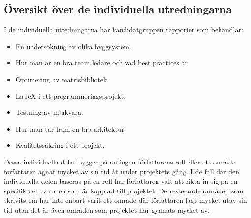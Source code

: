 \subsection{Översikt över de individuella utredningarna}
I de individuella utredningarna har kandidatgruppen rapporter som behandlar: 
\begin{itemize}
	\item En undersökning av olika byggsystem.
	\item Hur man är en bra team ledare och vad best practices är.
	\item Optimering av matrisbibliotek. 
	\item {\LaTeX} i ett programmeringsprojekt.
	\item Testning av mjukvara. 
	\item Hur man tar fram en bra arkitektur. 
	\item Kvalitetssäkring i ett projekt.  
\end{itemize}
Dessa individuella delar bygger på antingen författarens roll eller ett område författaren ägnat mycket av sin tid åt under projektets gång. I de fall där den individuella delen baseras på en roll har författaren valt att rikta in sig på en specifik del av rollen som är kopplad till projektet. De resterande områden som skrivits om har inte enbart varit ett område där författaren lagt mycket utav sin tid utan det är även områden som projektet har gynnats mycket av.
